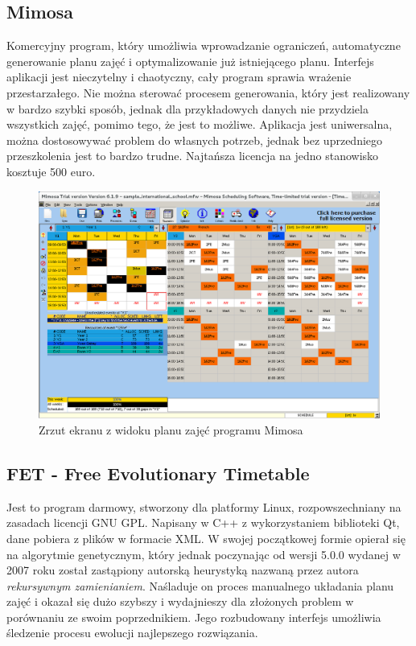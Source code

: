 \subsection{Mimosa}
Komercyjny program, który umożliwia wprowadzanie ograniczeń, automatyczne generowanie planu zajęć i optymalizowanie już istniejącego planu. Interfejs aplikacji jest nieczytelny i chaotyczny, cały program sprawia wrażenie przestarzałego. Nie można sterować procesem generowania, który jest realizowany w bardzo szybki sposób, jednak dla przykładowych danych nie przydziela wszystkich zajęć, pomimo tego, że jest to możliwe. Aplikacja jest uniwersalna, można dostosowywać problem do własnych potrzeb, jednak bez uprzedniego przeszkolenia jest to bardzo trudne. Najtańsza licencja na jedno stanowisko kosztuje 500 euro.
\begin{figure}[H]
\includegraphics[width=15cm]{img/mimosa.png}
\caption{Zrzut ekranu z widoku planu zajęć programu Mimosa}
\end{figure}
\subsection{FET - Free Evolutionary Timetable}
Jest to program darmowy, stworzony dla platformy Linux, rozpowszechniany na zasadach licencji GNU GPL. Napisany w C++ z wykorzystaniem biblioteki Qt, dane pobiera z plików w formacie XML. W swojej początkowej formie opierał się na algorytmie genetycznym, który jednak poczynając od wersji 5.0.0 wydanej w 2007 roku został zastąpiony autorską heurystyką nazwaną przez autora \emph{rekursywnym zamienianiem}. Naśladuje on proces manualnego układania planu zajęć i okazał się dużo szybszy i wydajnieszy dla złożonych problem w porównaniu ze swoim poprzednikiem. Jego rozbudowany interfejs umożliwia śledzenie procesu ewolucji najlepszego rozwiązania.
